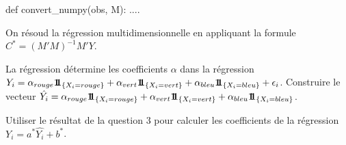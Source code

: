 \begin{xexercice}
\begin{verbatimx}
def convert_numpy(obs, M):
    ....
\end{verbatimx}

\exequest On résoud la régression multidimensionnelle en appliquant la formule $C^* = (M'M)^{-1}M'Y$.

\exequest La régression détermine les coefficients $\alpha$ dans la régression $Y_i = \alpha_{rouge} \mathbf{1\!\!1}_{\left\{X_i = rouge\right\}} + \alpha_{vert} \mathbf{1\!\!1}_{\left\{X_i = vert\right\}} + \alpha_{bleu} \mathbf{1\!\!1}_{\left\{X_i = bleu\right\}} + \epsilon_i$.
Construire le vecteur $\hat{Y_i} = \alpha_{rouge} \mathbf{1\!\!1}_{\left\{X_i = rouge\right\}} + \alpha_{vert} \mathbf{1\!\!1}_{\left\{X_i = vert\right\}} + \alpha_{bleu} \mathbf{1\!\!1}_{\left\{X_i = bleu\right\}}$.

\exequest Utiliser le résultat de la question 3 pour calculer les coefficients de la régression $Y_i = a^* \hat{Y_i} + b^*$.


\end{xexercice}






\firstpassagedo{
\newpage
\sametextforthisinterro
}




